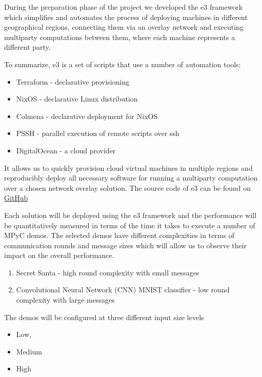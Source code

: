 During the preparation phase of the project we developed the \gls{e3}
framework which simplifies and automates the process of deploying
machines in different geographical regions, connecting them via an
overlay network and executing multiparty computations between them,
where each machine represents a different party.

To summarize, \gls{e3} is a set of scripts that use a number of
automation tools:

\begin{itemize}
\tightlist
\item
  Terraform - declarative provisioning
\item
  NixOS - declarative Linux distribution
\item
  Colmena - declarative deployment for NixOS
\item
  PSSH - parallel execution of remote scripts over ssh
\item
  DigitalOcean - a cloud provider
\end{itemize}

It allows us to quickly provision cloud virtual machines in multiple
regions and reproducibly deploy all necessary software for running a
multiparty computation over a chosen network overlay solution. The
source code of \gls{e3} can be found on
\href{https://github.com/e-nikolov/mpyc}{GitHub}

Each solution will be deployed using the \gls{e3} framework and the
performance will be quantitatively measured in terms of the time it
takes to execute a number of MPyC demos. The selected demos have
different complexities in terms of communication rounds and message
sizes which will allow us to observe their impact on the overall
performance.

\begin{enumerate}
\def\labelenumi{\arabic{enumi}.}
\tightlist
\item
  Secret Santa - high round complexity with small messages
\item
  Convolutional Neural Network (CNN) MNIST classifier - low round
  complexity with large messages
\end{enumerate}

The demos will be configured at three different input size levels

\begin{itemize}
\tightlist
\item
  Low,
\item
  Medium
\item
  High
\end{itemize}

